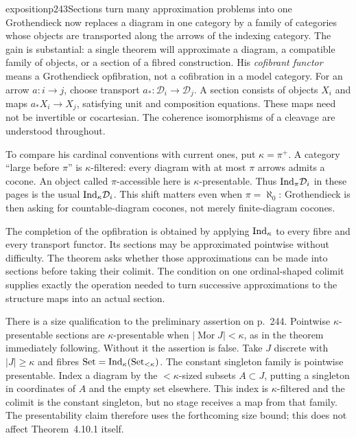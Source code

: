 \begin{dcomment}{exposition}{p243}{Sections turn many approximation problems into one}
Grothendieck now replaces a diagram in one category by a family of categories whose objects are transported along the arrows of the indexing category. The gain is substantial: a single theorem will approximate a diagram, a compatible family of objects, or a section of a fibred construction. His \emph{cofibrant functor} means a Grothendieck opfibration, not a cofibration in a model category. For an arrow $a:i\to j$, choose transport $a_*:\mathcal D_i\to\mathcal D_j$. A section consists of objects $X_i$ and maps $a_*X_i\to X_j$, satisfying unit and composition equations. These maps need not be invertible or cocartesian. The coherence isomorphisms of a cleavage are understood throughout.

To compare his cardinal conventions with current ones, put $\kappa=\pi^+$. A category ``large before $\pi$'' is $\kappa$-filtered: every diagram with at most $\pi$ arrows admits a cocone. An object called $\pi$-accessible here is $\kappa$-presentable. Thus $\mathrm{Ind}_\pi\mathcal D_i$ in these pages is the usual $\mathrm{Ind}_\kappa\mathcal D_i$. This shift matters even when $\pi=\aleph_0$: Grothendieck is then asking for countable-diagram cocones, not merely finite-diagram cocones.

The completion of the opfibration is obtained by applying $\mathrm{Ind}_\kappa$ to every fibre and every transport functor. Its sections may be approximated pointwise without difficulty. The theorem asks whether those approximations can be made into sections before taking their colimit. The condition on one ordinal-shaped colimit supplies exactly the operation needed to turn successive approximations to the structure maps into an actual section.

There is a size qualification to the preliminary assertion on p.~244. Pointwise $\kappa$-presentable sections are $\kappa$-presentable when $|\operatorname{Mor}J|<\kappa$, as in the theorem immediately following. Without it the assertion is false. Take $J$ discrete with $|J|\geq\kappa$ and fibres $\mathrm{Set}=\mathrm{Ind}_\kappa(\mathrm{Set}_{<\kappa})$. The constant singleton family is pointwise presentable. Index a diagram by the $<\kappa$-sized subsets $A\subset J$, putting a singleton in coordinates of $A$ and the empty set elsewhere. This index is $\kappa$-filtered and the colimit is the constant singleton, but no stage receives a map from that family. The presentability claim therefore uses the forthcoming size bound; this does not affect Theorem~4.10.1 itself.
\end{dcomment}


